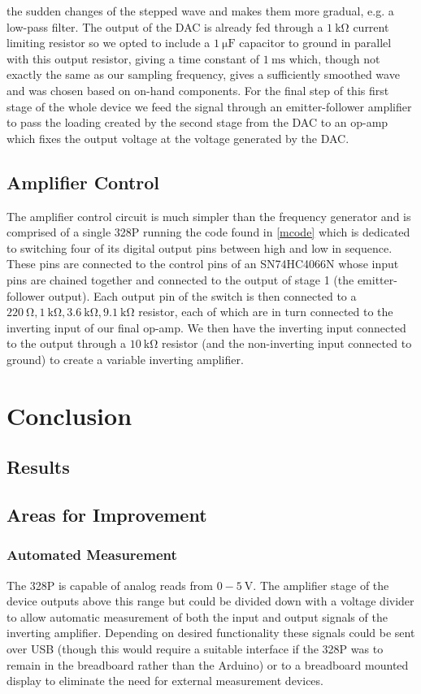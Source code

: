 \documentclass[10pt]{article}
\theoremstyle{definition}
\begin{document}
the sudden changes of the stepped wave and makes them more gradual, e.g. a low-pass filter. The output
of the DAC is already fed through a $\qty{1}{\kilo\ohm}$ current limiting resistor so we opted to include
a $\qty{1}{\micro\farad}$ capacitor to ground in parallel with this output resistor, giving a time constant of
$\qty{1}{\milli\second}$ which, though not exactly the same as our sampling frequency, gives a sufficiently smoothed wave
and was chosen based on on-hand components. For the final step of this first stage of the whole device we feed the signal
through an emitter-follower amplifier to pass the loading created by the second stage
from the DAC to an op-amp which fixes the output voltage at the voltage generated by the DAC.
\subsection{Amplifier Control}
The amplifier control circuit is much simpler than the frequency generator and is comprised
of a single 328P running the code found in \ref{mcode} which is dedicated to switching four of its digital output pins between high and
low in sequence. These pins are connected to the control pins of an SN74HC4066N\cite{TI:sn74hc4066} whose input pins are chained
together and connected to the output of stage 1 (the emitter-follower output). Each output pin of the switch
is then connected to a $\qty{220}{\ohm},\qty{1}{\kilo\ohm}, \qty{3.6}{\kilo\ohm}, \qty{9.1}{\kilo\ohm}$ resistor, each of which are
in turn connected to the inverting input of our final op-amp. We then have the inverting input connected to the output
through a $\qty{10}{\kilo\ohm}$ resistor (and the non-inverting input connected to ground) to create a variable
inverting amplifier.
\section{Conclusion}
\subsection{Results}
\subsection{Areas for Improvement}
\subsubsection{Automated Measurement}
The 328P is capable of analog reads from $0-\qty{5}{\volt}$. The amplifier stage of the device outputs above this range but
could be divided down with a voltage divider to allow automatic measurement of both the input and output signals of the inverting amplifier.
Depending on desired functionality these signals could be sent over USB (though this would require a suitable interface if the 328P was to remain
in the breadboard rather than the Arduino) or to a breadboard mounted display to eliminate the need for external measurement devices.
\end{document}
